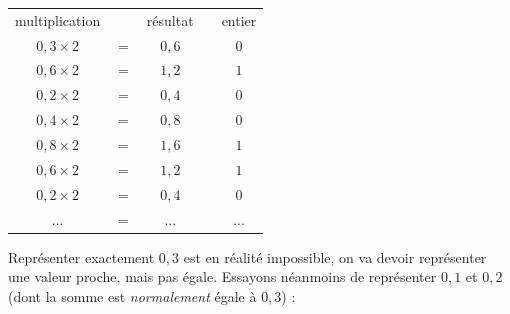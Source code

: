 \documentclass[11pt,a4paper]{article}
\begin{document}
\begin{center}
\begin{tabular}{c c c   m{1cm}   c }
multiplication        &         & résultat    & & entier \\
$ 0,3 \times 2 $  &  $ = $  &  $ 0,6 $  & & $ 0 $ \\
$ 0,6 \times 2 $  &  $ = $  &  $ 1,2 $  & & $ 1 $ \\
$ 0,2 \times 2 $  &  $ = $  &  $ 0,4 $  & & $ 0 $ \\
$ 0,4 \times 2 $  &  $ = $  &  $ 0,8 $  & & $ 0 $ \\
$ 0,8 \times 2 $  &  $ = $  &  $ 1,6 $  & & $ 1 $ \\
$ 0,6 \times 2 $  &  $ = $  &  $ 1,2 $  & & $ 1 $ \\
$ 0,2 \times 2 $  &  $ = $  &  $ 0,4 $  & & $ 0 $ \\
 ... & $ = $ & ... & & ... \\
\end{tabular}
\end{center}

\medskip

Représenter exactement $ 0,3 $ est en réalité impossible, on va devoir représenter une valeur proche, mais pas égale.
Essayons néanmoins de représenter $ 0,1 $ et $ 0,2 $ (dont la somme est \textit{normalement} égale à $ 0,3 $) :
\end{document}

